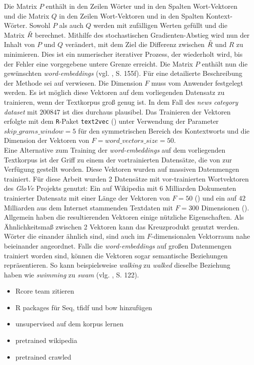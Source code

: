 \documentclass[a4paper,11pt]{article}
\begin{document}
Die Matrix $P$ enthält in den Zeilen Wörter und in den Spalten Wort-Vektoren und die Matrix $Q$ in den Zeilen Wort-Vektoren und in den Spalten Kontext-Wörter. Sowohl $P$ als auch $Q$ werden mit zufälligen Werten gefüllt und die Matrix $\Tilde{R}$ berechnet. Mithilfe des stochastischen Gradienten-Abstieg wird nun der Inhalt von $P$ und $Q$ verändert, mit dem Ziel die Differenz zwischen $\Tilde{R}$ und $R$ zu minimieren. Dies ist ein numerischer iterativer Prozess, der wiederholt wird, bis der Fehler eine vorgegebene untere Grenze erreicht. Die Matrix $P$ enthält nun die gewünschten \textit{word-embeddings} (vgl. \cite{keras}, S. 155f). Für eine detailierte Beschreibung der Methode sei auf \cite{glovePaper} verwiesen. Die Dimension $F$ muss vom Anwender festgelegt werden. Es ist möglich diese Vektoren auf dem vorliegenden Datensatz zu trainieren, wenn der Textkorpus groß genug ist. In dem Fall des \textit{news category dataset} mit $200847$ ist dies durchaus plausibel. Das Trainieren der Vektoren erfolgte mit dem \texttt{R}-Paket \texttt{text2vec} (\cite{text2vec}) unter Verwendung der Parameter $skip\_grams\_window = 5$ für den symmetrischen Bereich des Kontextworts und die Dimension der Vektoren von $F = word\_vectors\_size = 50$.\\
Eine Alternative zum Training der \textit{word-embeddings} auf dem vorliegenden Textkorpus ist der Griff zu einem der vortrainierten Datensätze, die von \cite{gloveOnline} zur Verfügung gestellt worden. Diese Vektoren wurden auf massiven Datenmengen trainiert. Für diese Arbeit wurden 2 Datensätze mit vor-trainierten Wortvektoren des \textit{GloVe} Projekts genutzt: Ein auf Wikipedia mit $6$ Milliarden Dokumenten trainierter Datensatz mit einer Länge der Vektoren von $F = 50$ (\cite{gloveWiki}) und ein auf $42$ Milliarden aus dem Internet stammenden Textdaten mit $F = 300$ Dimensionen (\cite{gloveCommon}).\\

Allgemein haben die resultierenden Vektoren einige nützliche Eigenschaften. Als Ähnlichkeitsmaß zwischen 2 Vektoren kann das Kreuzprodukt genutzt werden. Wörter die einander ähnlich sind, sind auch im $F$-dimensionalen Vektorraum nahe beieinander angeordnet. Falls die \textit{word-embeddings} auf großen Datenmengen trainiert worden sind, können die Vektoren sogar semantische Beziehungen repräsentieren. So kann beispielsweise \textit{walking} zu \textit{walked} dieselbe Beziehung haben wie \textit{swimming} zu \textit{swam} (vlg. \cite{deepEssentials}, S. 122).


\begin{itemize}
\item Rcore team zitieren
\item R packages für Seq, tfidf und bow hinzufügen
    \item unsupervised auf dem korpus lernen
    \item pretrained wikipedia
    \item pretrained crawled
\end{itemize}{}
\end{document}
